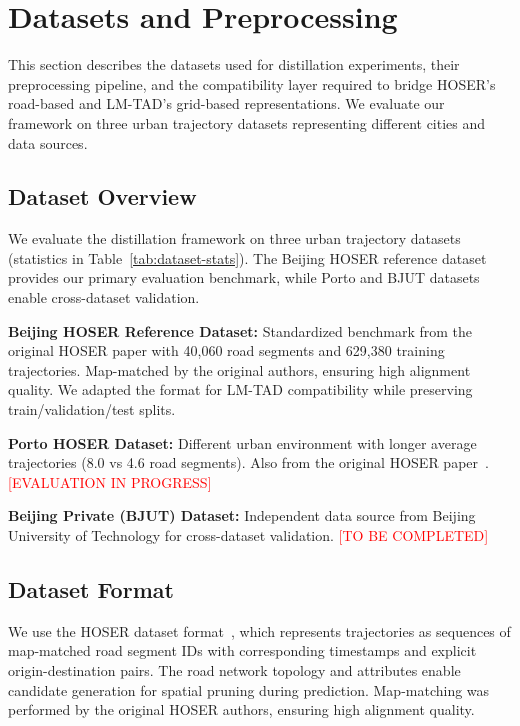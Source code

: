 
\section{Datasets and Preprocessing}
\label{sec:data-preprocessing}

This section describes the datasets used for distillation experiments, their preprocessing pipeline, and the compatibility layer required to bridge HOSER's road-based and LM-TAD's grid-based representations. We evaluate our framework on three urban trajectory datasets representing different cities and data sources.

\subsection{Dataset Overview}
\label{sec:data-overview}

We evaluate the distillation framework on three urban trajectory datasets (statistics in Table~\ref{tab:dataset-stats}). The Beijing HOSER reference dataset~\cite{caoHolisticSemanticRepresentation2025} provides our primary evaluation benchmark, while Porto and BJUT datasets enable cross-dataset validation.

\textbf{Beijing HOSER Reference Dataset:} Standardized benchmark from the original HOSER paper with 40,060 road segments and 629,380 training trajectories. Map-matched by the original authors, ensuring high alignment quality. We adapted the format for LM-TAD compatibility while preserving train/validation/test splits.

\textbf{Porto HOSER Dataset:} Different urban environment with longer average trajectories (8.0 vs 4.6 road segments). Also from the original HOSER paper~\cite{caoHolisticSemanticRepresentation2025}. \textcolor{red}{[EVALUATION IN PROGRESS]}

\textbf{Beijing Private (BJUT) Dataset:} Independent data source from Beijing University of Technology for cross-dataset validation. \textcolor{red}{[TO BE COMPLETED]}

\subsection{Dataset Format}
\label{sec:data-format}

We use the HOSER dataset format~\cite{caoHolisticSemanticRepresentation2025}, which represents trajectories as sequences of map-matched road segment IDs with corresponding timestamps and explicit origin-destination pairs. The road network topology and attributes enable candidate generation for spatial pruning during prediction. Map-matching was performed by the original HOSER authors, ensuring high alignment quality.


